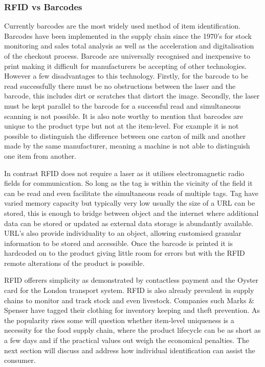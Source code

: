 \documentclass[a4paper, 11pt]{article}
\begin{document}
\subsubsection{RFID vs Barcodes}Currently barcodes are the most widely used method of item identification. Barcodes have been implemented in the supply chain since the 1970's for stock monitoring and sales total analysis as well as the acceleration and digitalisation of the checkout process. Barcode are universally recognised and inexpensive to print making it difficult for manufacturers be accepting of other technologies. However a few disadvantages to this technology. Firstly, for the barcode to be read successfully there must be no obstructions between the laser and the barcode, this includes dirt or scratches that distort the image. Secondly, the laser must be kept parallel to the barcode for a successful read and simultaneous scanning is not possible. It is also note worthy to mention that barcodes are unique to the product type but not at the item-level. For example it is not possible to distinguish the difference between one carton of milk and another made by the same manufacturer, meaning a machine is not able to distinguish one item from another.

In contrast RFID does not require a laser as it utilises electromagnetic radio fields for communication. So long as the tag is within the vicinity of the field it can be read and even facilitate the simultaneous reads of multiple tags. Tag have varied memory capacity but typically very low usually the size of a URL can be stored, this is enough to bridge between object and the internet where additional data can be stored or updated as external data storage is abundantly available. URL's also provide individuality to an object, allowing customised granular information to be stored and accessible. Once the barcode is printed it is hardcoded on to the product giving little room for errors but with the RFID remote alterations of the product is possible.

RFID offerers simplicity as demonstrated by contactless payment and the Oyster card for the London transport system. RFID is also already prevalent in supply chains to monitor and track stock and even livestock. Companies such Marks \& Spenser have tagged their clothing for inventory keeping and theft prevention. As the popularity rises some will question whether item-level uniqueness is a necessity for the food supply chain, where the product lifecycle can be as short as a few days and if the practical values out weigh the economical penalties. The next section will discuss and address how individual identification can assist the consumer.
\end{document}

